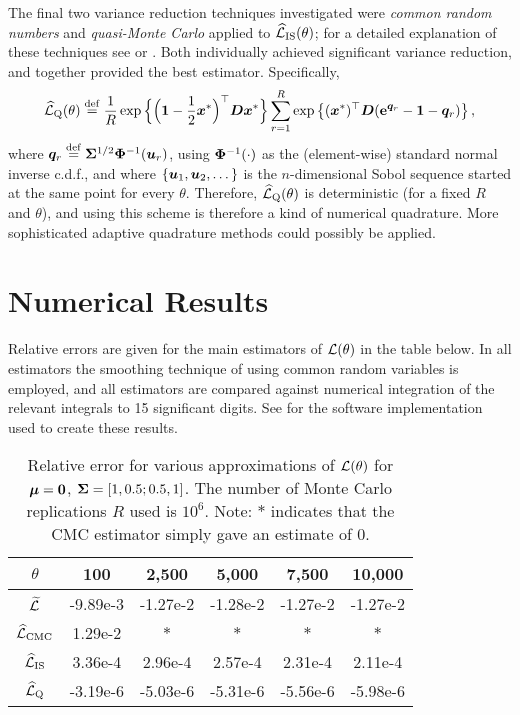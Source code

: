 The final two variance reduction techniques investigated were \emph{common
  random numbers} and \emph{quasi-Monte Carlo} applied to
$\widehat{\mathcal{L}}_{\mathrm{IS}}(\theta)$; for a detailed explanation of
these techniques see \cite{glasserman2003monte} or
\cite{asmussen2007stochastic}. Both individually achieved significant variance
reduction, and together provided the best estimator. Specifically,
%
\[ \widehat{\mathcal{L}}_{\mathrm{Q}}(\theta) \overset{\mathrm{def}}{=} \frac{1}{R} \exp\Big\{
\Big(\bm{1} - \frac12 \bm{x}^* \Big)^\top \bm{D} \bm{x}^* \Big\}  \sum_{r=1}^R
\exp\left\{ (\bm{x}^*)^\top \bm{D} (\bm{\mathrm{e}}^{\bm{q}_r} - \bm{1} - \bm{q}_r) \right\}, \]
%
where $\bm{q}_r \overset{\mathrm{def}}{=} \bm{\Sigma}^{1/2} \mathrm{\bf\Phi}^{-1}(\bm{u}_r)$, using
$\mathrm{\bf\Phi}^{-1}(\cdot)$ as the (element-wise) standard normal inverse
c.d.f., and where $\{\bm{u}_1, \bm{u}_2, \dots\}$ is the $n$-dimensional Sobol
sequence started at the same point for every $\theta$. Therefore,
$\widehat{\mathcal{L}}_{\mathrm{Q}}(\theta)$ is deterministic (for a fixed $R$
and $\theta$), and using this scheme is therefore a kind of numerical
quadrature. More sophisticated adaptive quadrature methods could possibly be
applied.

\section{Numerical Results}\label{S:Num}

Relative errors are given for the main estimators of $\mathcal{L}(\theta)$ in the
table below. In all estimators the smoothing technique of using common random
variables is employed, and all estimators are compared against numerical
integration of the relevant integrals to 15 significant digits. See \cite{Code} for the software implementation used to create these results.

\begin{table}[h]
\centering
\caption{Relative error for various approximations of $\mathcal{L}(\theta)$ for
  $\bm{\mu} = \bm{0}$, $\bm{\Sigma} = [1, 0.5; 0.5, 1]$. The number of Monte Carlo
  replications $R$ used is $10^6$. Note: $*$ indicates that the CMC estimator
  simply gave an estimate of 0.}
\vspace{3pt}
\begin{tabular}{cccccc}
\hline
{$\theta$}& 100 & 2{,}500 & 5{,}000 & 7{,}500 & 10{,}000 \\ \hline
$\widetilde{\Laplace}$\raisebox{1pt}{\vphantom{$\widetilde{\Laplace}$}}&
{-9.89e-3 }&{-1.27e-2 }&{-1.28e-2 }&{-1.27e-2 }&{-1.27e-2 }\\
{$\widehat{\mathcal{L}}_{\mathrm{CMC}}$}&
{1.29e-2 }&{$*$}&{$*$}&{$*$}&{$*$} \\
{$\widehat{\mathcal{L}}_{\mathrm{IS}}$}&
{3.36e-4 }&{2.96e-4 }&{2.57e-4 }&{2.31e-4 }&{2.11e-4 } \\
{$\widehat{\mathcal{L}}_{\mathrm{Q}}$}&
{-3.19e-6 }&{-5.03e-6 }&{-5.31e-6}&{-5.56e-6 }&{-5.98e-6 } \\ \hline
\end{tabular}
\end{table}

